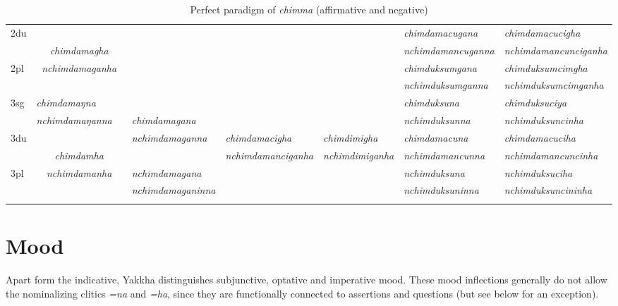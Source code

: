 \begin{landscape}
\begin{table}[p]
{\begin{tabular}{|l||p{2.8cm}|p{1.6cm}|p{2.8cm}|p{3.0cm}|p{2.8cm}|p{3.2cm}|p{3.6cm}|}
 \cline{1-2} \cline{7-8}			
{\sc 2du}		& \multicolumn{2}{c|}{}     & \multicolumn{3}{c|}{\cellcolor[gray]{.8}} & \it  chimdamacugana  & \it   chimdamacucigha \\
		& \multicolumn{2}{c|}{\it chimdamagha} & \multicolumn{3}{c|}{\cellcolor[gray]{.8} }& \it nchimdamancuganna  & \it  nchimdamancunciganha \\
 \cline{1-1} \cline{7-8}			
{\sc 2pl}		& \multicolumn{2}{c|}{\it nchimdamaganha} & \multicolumn{3}{c|}{\cellcolor[gray]{.8} }& \it  chimduksumgana& \it  chimduksumcimgha  \\
		& \multicolumn{2}{c|}{ }& \multicolumn{3}{c|}{ \cellcolor[gray]{.8}}& \it  nchimduksumganna & \it  nchimduksumcimganha \\
\hline			
{\sc 3sg} 		& \it chimdamaŋna	  & \it 	      	& \it   			& \it     & \it     	& \it chimduksuna& \it chimduksuciya\\
		& \it  nchimdamaŋanna   & \it    	& \it  chimdamagana	& \it   & \it    & \it nchimduksunna& \it nchimduksuncinha\\
  \cline{1-2}  \cline{7-8}					
{\sc 3du}&  \multicolumn{2}{c|}{}& \it nchimdamaganna& \it  chimdamacigha& \it chimdimigha& \it   chimdamacuna & \it   chimdamacuciha\\
	& \multicolumn{2}{c|}{\it chimdamha}& \it  & \it nchimdamanciganha& \it  nchimdimiganha & \it  nchimdamancunna & \it  nchimdamancuncinha\\
 \cline{1-1} \cline{4-4} \cline{7-8}	
{\sc 3pl} &  \multicolumn{2}{c|}{\it nchimdamanha}	& \it nchimdamagana& \it  & \it  & \it nchimduksuna& \it nchimduksuciha\\	
	&\multicolumn{2}{c|}{ }& \it nchimdamaganinna& \it & \it  & \it nchimduksuninna& \it nchimduksuncininha \\
\lspbottomrule
\end{tabular}
}
\caption{Perfect paradigm of \emph{chimma}  (affirmative and negative)}\label{par-chimd-prf}
\end{table}

\end{landscape}


\section{Mood}\label{mood}

Apart form the indicative, Yakkha distinguishes subjunctive, optative and  imperative mood. These mood inflections generally do not allow the nominalizing clitics \emph{=na} and \emph{=ha}, since they are functionally connected to assertions and questions (but see below for an exception).

